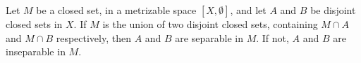 Let $M$ be a closed set, in a metrizable space $[X, \emptyset]$, and let $A$ and $B$ be disjoint closed sets in $X$. If $M$ is the union of two disjoint closed sets, containing $M \cap A$ and $M \cap B$ respectively, then $A$ and $B$ are separable in $M$. If not, $A$ and $B$ are inseparable in $M$.
